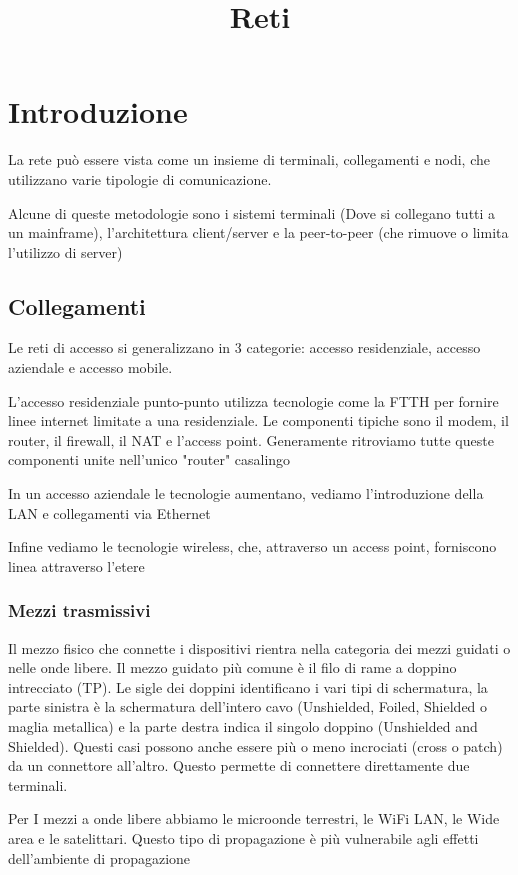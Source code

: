 \documentclass[12pt, a4paper]{article}
\title{Reti}
\begin{document}
\tableofcontents
\newpage

\section{Introduzione}

La rete può essere vista come un insieme di terminali, collegamenti e nodi, che utilizzano varie tipologie di comunicazione.

Alcune di queste metodologie sono i sistemi terminali (Dove si collegano tutti a un mainframe), l'architettura client/server 
e la peer-to-peer (che rimuove o limita l'utilizzo di server)

\subsection{Collegamenti}
Le reti di accesso si generalizzano in 3 categorie: accesso residenziale, accesso aziendale e accesso mobile.

L'accesso residenziale punto-punto utilizza tecnologie come la FTTH per fornire linee internet limitate a una residenziale.
Le componenti tipiche sono il modem, il router, il firewall, il NAT e l'access point. Generamente ritroviamo tutte queste 
componenti unite nell'unico "router" casalingo

In un accesso aziendale le tecnologie aumentano, vediamo l'introduzione della LAN e collegamenti via Ethernet

Infine vediamo le tecnologie wireless, che, attraverso un access point, forniscono linea attraverso l'etere

\subsubsection*{Mezzi trasmissivi}
Il mezzo fisico che connette i dispositivi rientra nella categoria dei mezzi guidati o nelle onde libere. Il mezzo guidato
più comune è il filo di rame a doppino intrecciato (TP). Le sigle dei doppini identificano i vari tipi di schermatura, 
la parte sinistra è la schermatura dell'intero cavo (Unshielded, Foiled, Shielded o maglia metallica) e la parte destra 
indica il singolo doppino (Unshielded and Shielded). Questi casi possono anche essere più o meno incrociati (cross o patch)
da un connettore all'altro. Questo permette di connettere direttamente due terminali. 


Per I mezzi a onde libere abbiamo le microonde terrestri, le WiFi LAN, le Wide area e le satelittari. Questo tipo di 
propagazione è più vulnerabile agli effetti dell'ambiente di propagazione
\end{document}
